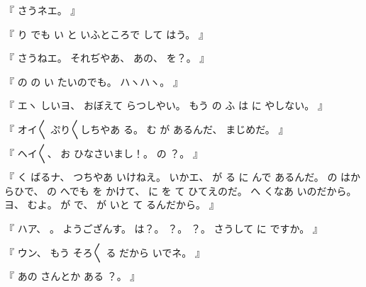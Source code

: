 %
『
さうネエ。
』

%
『
り
でも
い
と
いふところで
して%
はう。
』

%
『
さうねエ。
%
それぢやあ、
%
あの、
%
を？。
』

%
『
の
の%
い
たいのでも。
%
ハヽハヽ。
』

%
『
エヽ
しいヨ、
%
おぼえて
らつしやい。
%
もう
の
ふ
は
に
やしない。
』

%
『
オイ〳〵
ぷり〳〵しちやあ
る。
%
む
が
あるんだ、
%
まじめだ。
』

%
『
ヘイ〳〵、
%
お
ひなさいまし！。
%
の
？。
』

%
『
く
ばるナ、
%
つちやあ
いけねえ。
%
いかエ、
%
が
る
に
んで
あるんだ。
%
の
はからひで、
%
の
へでも
を
かけて、
%
に
を
て
ひてえのだ。
%
へ
くなあ
いのだから。
%
ヨ、
%
むよ。
%
が
で、
%
が
いと
て
%
るんだから。
』

%
『
ハア、
%
。
%
ようござんす。
%
は？。
%
？。
%
？。
%
%
さうして
に
ですか。%
』

%
『
ウン、
%
もう
そろ〳〵
る
だから
いでネ。
』

%
『
あの
さんとか
ある
？。
』

